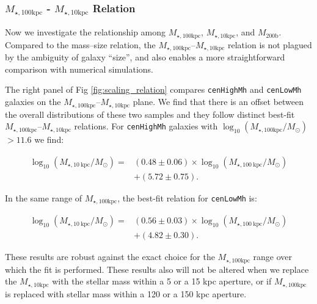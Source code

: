 \documentclass[a4paper,fleqn,usenatbib]{mnras}
\def\rbcg{\texttt{cenHighMh}}
\def\nbcg{\texttt{cenLowMh}}
\def\mhalo{{$M_{\mathrm{200b}}$}}
\def\minn{{$M_{\star,10\mathrm{kpc}}$}}
\def\mtot{{$M_{\star,100\mathrm{kpc}}$}}
\def\logmtot{{$\log_{10} (M_{\star,100\mathrm{kpc}}/M_{\odot})$}}
\begin{document}
\subsubsection{\mtot{} - \minn{} Relation}
    \label{sssec:m100_m10}
    
    Now we investigate the relationship among \mtot{}, \minn{}, and \mhalo{}. 
    Compared to the mass--size relation, the \mtot{}--\minn{} relation is not plagued 
    by the ambiguity of galaxy ``size'', and also enables a more straightforward 
    comparison with numerical simulations.
    
    The right panel of Fig \ref{fig:scaling_relation} compares \rbcg{} and \nbcg{}
    galaxies on the \mtot{}--\minn{} plane. 
    We find that there is an offset between the overall distributions of these two
    samples and they follow distinct best-fit \mtot{}--\minn{} relations. 
    For \rbcg{} galaxies with \logmtot{}$>11.6$ we find:
    
    \begin{equation}
        \begin{aligned}
        \log_{10} (M_{\star, 10\ \mathrm{kpc}}/M_{\odot}) = & (0.48\pm0.06) \times \log_{10} (M_{\star, 100\ \mathrm{kpc}}/M_{\odot}) \\ & +(5.72\pm0.75).
        \end{aligned}
    \end{equation}
    
    \noindent In the same range of \mtot{}, the best-fit relation for \nbcg{} is:
     
    \begin{equation}
        \begin{aligned}
        \log_{10} (M_{\star, 10\ \mathrm{kpc}}/M_{\odot}) = & (0.56\pm0.03) \times \log_{10} (M_{\star, 100\ \mathrm{kpc}}/M_{\odot}) \\ & +(4.82\pm0.30).
        \end{aligned}
    \end{equation}
    
    These results are robust against the exact choice for the \mtot{} range over which 
    the fit is performed. 
    These results also will not be altered when we replace the \minn{} with the stellar 
    mass within a 5 or a 15 kpc aperture, or if \mtot{} is replaced with stellar mass 
    within a 120 or a 150 kpc aperture.  
     
\end{document}
